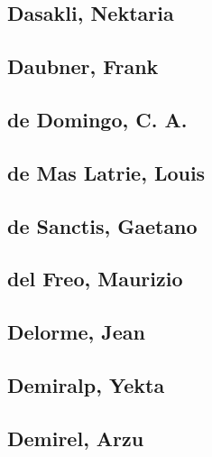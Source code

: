 \subsection[Dasakli, Nektaria (1)]{Dasakli, Nektaria}

\subsection[Daubner, Frank (1)]{Daubner, Frank}

\subsection[de Domingo, C. A. (1)]{de Domingo, C. A.}

\subsection[de Mas Latrie, Louis (1)]{de Mas Latrie, Louis}

\subsection[de Sanctis, Gaetano (2)]{de Sanctis, Gaetano}


\subsection[del Freo, Maurizio (1)]{del Freo, Maurizio}

\subsection[Delorme, Jean (1)]{Delorme, Jean}

\subsection[Demiralp, Yekta (2)]{Demiralp, Yekta}


\subsection[Demirel, Arzu (1)]{Demirel, Arzu}

